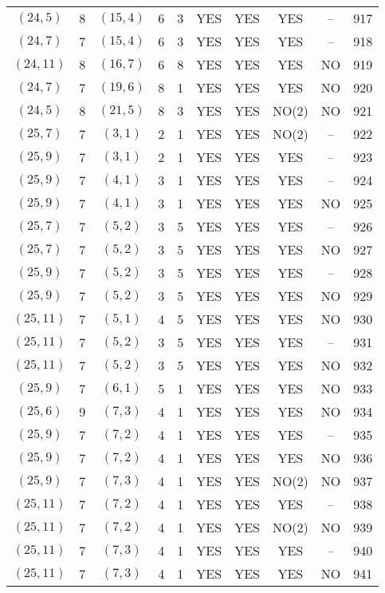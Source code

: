 \begin{longtable}{|c|c|c|c|c|c|c|c|c|c|}
$(24, 5)$ & 8 & $(15, 4)$ & 6 & 3 & YES & YES & YES & -- & 917\\
$(24, 7)$ & 7 & $(15, 4)$ & 6 & 3 & YES & YES & YES & -- & 918\\
$(24, 11)$ & 8 & $(16, 7)$ & 6 & 8 & YES & YES & YES & NO & 919\\
$(24, 7)$ & 7 & $(19, 6)$ & 8 & 1 & YES & YES & YES & NO & 920\\
$(24, 5)$ & 8 & $(21, 5)$ & 8 & 3 & YES & YES & NO(2) & NO & 921\\
$(25, 7)$ & 7 & $(3, 1)$ & 2 & 1 & YES & YES & NO(2) & -- & 922\\
$(25, 9)$ & 7 & $(3, 1)$ & 2 & 1 & YES & YES & YES & -- & 923\\
$(25, 9)$ & 7 & $(4, 1)$ & 3 & 1 & YES & YES & YES & -- & 924\\
$(25, 9)$ & 7 & $(4, 1)$ & 3 & 1 & YES & YES & YES & NO & 925\\
$(25, 7)$ & 7 & $(5, 2)$ & 3 & 5 & YES & YES & YES & -- & 926\\
$(25, 7)$ & 7 & $(5, 2)$ & 3 & 5 & YES & YES & YES & NO & 927\\
$(25, 9)$ & 7 & $(5, 2)$ & 3 & 5 & YES & YES & YES & -- & 928\\
$(25, 9)$ & 7 & $(5, 2)$ & 3 & 5 & YES & YES & YES & NO & 929\\
$(25, 11)$ & 7 & $(5, 1)$ & 4 & 5 & YES & YES & YES & NO & 930\\
$(25, 11)$ & 7 & $(5, 2)$ & 3 & 5 & YES & YES & YES & -- & 931\\
$(25, 11)$ & 7 & $(5, 2)$ & 3 & 5 & YES & YES & YES & NO & 932\\
$(25, 9)$ & 7 & $(6, 1)$ & 5 & 1 & YES & YES & YES & NO & 933\\
$(25, 6)$ & 9 & $(7, 3)$ & 4 & 1 & YES & YES & YES & NO & 934\\
$(25, 9)$ & 7 & $(7, 2)$ & 4 & 1 & YES & YES & YES & -- & 935\\
$(25, 9)$ & 7 & $(7, 2)$ & 4 & 1 & YES & YES & YES & NO & 936\\
$(25, 9)$ & 7 & $(7, 3)$ & 4 & 1 & YES & YES & NO(2) & NO & 937\\
$(25, 11)$ & 7 & $(7, 2)$ & 4 & 1 & YES & YES & YES & -- & 938\\
$(25, 11)$ & 7 & $(7, 2)$ & 4 & 1 & YES & YES & NO(2) & NO & 939\\
$(25, 11)$ & 7 & $(7, 3)$ & 4 & 1 & YES & YES & YES & -- & 940\\
$(25, 11)$ & 7 & $(7, 3)$ & 4 & 1 & YES & YES & YES & NO & 941\\

\end{longtable}
